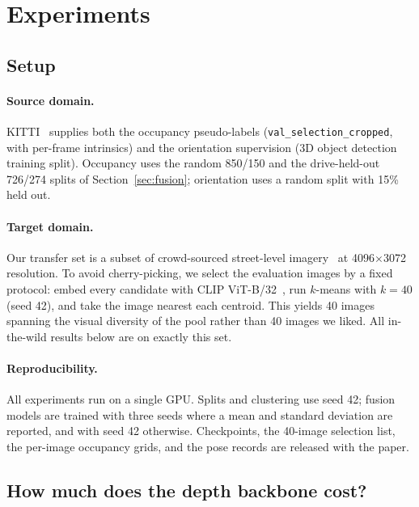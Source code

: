 \documentclass[sigconf]{acmart}
\newcommand{\rev}[1]{{\color{revcolor}#1}}
\begin{document}
\section{Experiments}

\subsection{Setup}

\paragraph{Source domain.} KITTI~\cite{geiger2012kitti} supplies both the occupancy pseudo-labels (\texttt{val\_\allowbreak selection\_\allowbreak cropped}, with per-frame intrinsics) and the orientation supervision (3D object detection training split). \rev{Occupancy uses the random 850/150 and the drive-held-out 726/274 splits of Section~\ref{sec:fusion}; orientation uses a random split with 15\% held out.}

\paragraph{Target domain.} Our transfer set is a subset of crowd-sourced street-level imagery~\cite{neuhold2017mapillary} at 4096$\times$3072 resolution. To avoid cherry-picking, we select the evaluation images by a fixed protocol: embed every candidate with CLIP ViT-B/32~\cite{radford2021clip}, run $k$-means with $k = 40$ (seed 42), and take the image nearest each centroid. This yields 40 images spanning the visual diversity of the pool rather than 40 images we liked. All in-the-wild results below are on exactly this set.

\paragraph{Reproducibility.} All experiments run on a single GPU. Splits and clustering use seed 42; \rev{fusion models are trained with three seeds where a mean and standard deviation are reported, and with seed 42 otherwise.} Checkpoints, the 40-image selection list, the per-image occupancy grids, and the pose records are released with the paper.

\subsection{How much does the depth backbone cost?}\label{sec:backbone}
\end{document}
